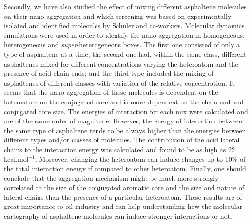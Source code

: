 Secondly, we have also studied the effect of mixing different asphaltene molecules on their nano-aggregation and which screening was based on experimentally isolated and identified molecules by Schuler and co-workers.\cite{schuler2015unraveling} Molecular dynamics simulations were used in order to identify the nano-aggregation in homogeneous, heterogeneous and \textit{super}-heterogeneous boxes. The first one consisted of only a type of asphaltene at a time; the second one had, within the same class, different asphaltenes mixed for different concentrations varying the heteroatom and the presence of acid chain-ends; and the third type included the mixing of asphaltenes of different classes with variation of the relative concentration. It seems that the nano-aggregation of these molecules is dependent on the heteroatom on the conjugated core and is more dependent on the chain-end and conjugated core size. The energies of interaction for each mix were calculated and are of the same order of magnitude. However, the energy of interaction between the same type of asphaltene tends to be always higher than the energies between different types and/or classes of molecules. The contribution of the acid lateral chains to the interaction energy was calculated and found to be as high as 22 kcal.mol$^{-1}$. Moreover, changing the heteroatom can induce changes up to 10\% of the total interaction energy if compared to other heteroatom. Finally, one should conclude that the aggregation mechanism might be much more strongly correlated to the size of the conjugated aromatic core and the size and nature of lateral chains than the presence of a particular heteroatom. These results are of great importance to oil industry and can help understanding how the molecular cartography of asphaltene molecules can induce stronger interactions or not. 